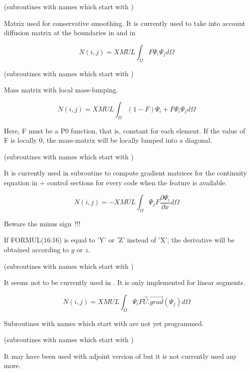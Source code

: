 
(subroutines with names which start with )

Matrix used for conservative smoothing.
It is currently used to take into account diffusion matrix at the boundaries
in  and in \artemis

\[N(i,j)=XMUL \int _{\Omega }F \Psi _{i} \Psi _{j} d\Omega  \]


(subroutines with names which start with )

Mass matrix with local mass-lumping.

\[N(i,j)=XMUL \int _{\Omega }(1-F) \Psi _{i} +F\Psi _{i} \Psi _{j} d\Omega  \]

Here, F must be a P0 function, that is, constant for each element. If the value
of F is locally 0, the mass-matrix will be locally lumped into a diagonal.


(subroutines with names which start with )

It is currently used in  subroutine to compute gradient matrices
for the continuity equation in  + control sections for every code
when the feature is available.

\[N(i,j)=-XMUL \int _{\Omega }
\Psi _{j}  F \frac{\partial \Psi _{i} }{\partial x} d\Omega  \]

Beware the minus sign~!!!

If FORMUL(16:16) is equal to 'Y' or 'Z' instead of 'X', the derivative will be
obtained according to $y$ or $z$.


(subroutines with names which start with )

It seems not to be currently used in \tel.
It is only implemented for linear segments.

\[N(i,j)=XMUL \int _{\Omega }\Psi _{i}  F\vec{U} . \overrightarrow{grad} (\Psi _{j} )d\Omega  \]

Subroutines with names which start with  are not yet programmed.


(subroutines with names which start with )

It may have been used with adjoint version of  but it is not
currently used any more.

